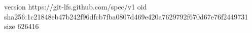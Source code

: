version https://git-lfs.github.com/spec/v1
oid sha256:1c21848eb47b242f96dfcb7fba0807d469e420a7629792f670d67e76f2449731
size 626416
